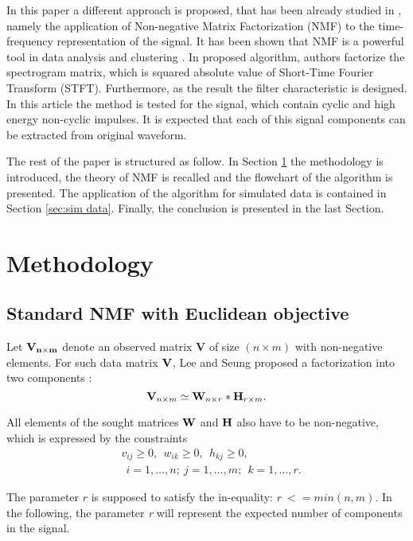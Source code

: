 \documentclass[conference,a4paper]{IEEEtran}
\newcommand{\beq}{\begin{equation}}
\newcommand{\eeq}{\end{equation}}
\begin{document}
In this paper a different approach is proposed, that has been already studied in \cite{wodecki2017local}, namely the application of Non-negative Matrix Factorization (NMF) to the time-frequency representation of the signal. It has been shown that NMF is a powerful tool in data analysis and clustering \cite{cichocki2009nonnegative, zdunek2008data, wang2013nonnegative,lee1999learning, he2011symmetric}. In proposed algorithm, authors factorize the spectrogram matrix, which is squared absolute value of Short-Time Fourier Transform (STFT). Furthermore, as the result the filter characteristic is designed. In this article the method is tested for the signal, which contain cyclic and high energy non-cyclic impulses. It is expected that each of this signal components can be extracted from original waveform.

The rest of the paper is structured as follow. In Section \ref{sec:methodology} the methodology is introduced, the theory of NMF is recalled and the flowchart of the algorithm is presented. The application of the algorithm for simulated data is contained in Section \ref{sec:sim data}. Finally, the conclusion is presented in the last Section.

\section{Methodology}
\label{sec:methodology}
\subsection{Standard NMF with Euclidean objective}

Let $\bf{V}_{n\times m} $ denote an observed matrix {\bf  V} of
size $(n\times m)$ with non-negative elements. For such data matrix
${\bf V}$, Lee and Seung  proposed a factorization into two components \cite{lee2001algorithms}:
\beq\label{V1} {\bf V}_{n\times m}\simeq
      {\bf W}_{n\times r}*{\bf H}_{r\times m}. \eeq
      
     
All elements of the sought matrices ${\bf W}$ and ${\bf H}$ also have to be
non-negative, which is expressed by the constraints
\begin{align*}
    &v_{ij}\ge0,~~w_{ik}\ge 0,~~ h_{kj}\ge 0,\\
    &~~i=1, \dots, n; ~j=1,\dots, m;
                ~~k=1,\dots,r.
\end{align*}

The parameter $r$ is supposed to satisfy the in-equality: $r~<= min(n,m)$.
In the following, the parameter \emph{r} will represent the expected number of components in the signal.
\end{document}
